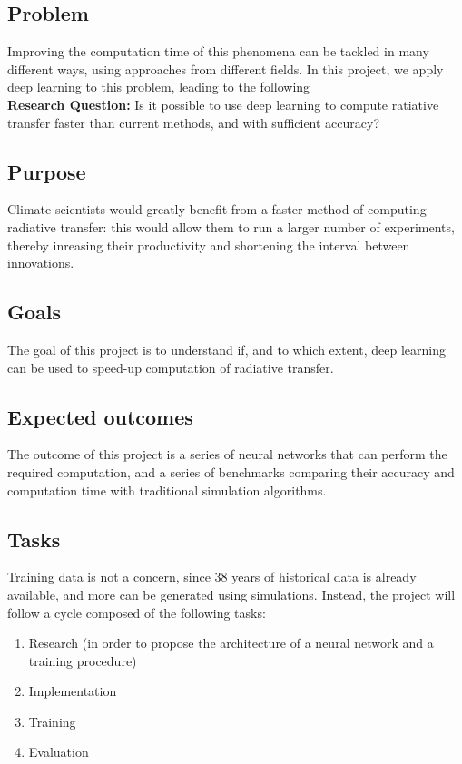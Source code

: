 \documentclass[11pt]{article}
\begin{document}
\subsection{Problem}
\label{sec:orgc3c4ae9}
Improving the computation time of this phenomena can be tackled in many different ways, using approaches from different fields. In this project, we apply deep learning to this problem, leading to the following \\

\textbf{\textbf{Research Question:}} Is it possible to use deep learning to compute ratiative transfer faster than current methods, and with sufficient accuracy?

\subsection{Purpose}
\label{sec:orgaf17169}
Climate scientists would greatly benefit from a faster method of computing radiative transfer: this would allow them to run a larger number of experiments, thereby inreasing their productivity and shortening the interval between innovations.

\subsection{Goals}
\label{sec:org66d6079}
The goal of this project is to understand if, and to which extent, deep learning can be used to speed-up computation of radiative transfer.

\subsection{Expected outcomes}
\label{sec:orga3c0cbe}
The outcome of this project is a series of neural networks that can perform the required computation, and a series of benchmarks comparing their accuracy and computation time with traditional simulation algorithms.

\subsection{Tasks}
\label{sec:org665a0ea}
Training data is not a concern, since 38 years of historical data is already available, and more can be generated using simulations. Instead, the project will follow a cycle composed of the following tasks:

\begin{enumerate}
\item Research (in order to propose the architecture of a neural network and a training procedure)
\item Implementation
\item Training
\item Evaluation
\end{enumerate}
\end{document}
